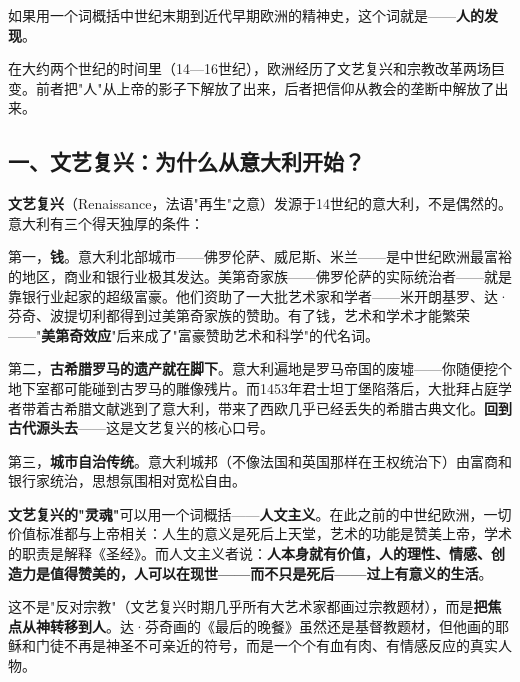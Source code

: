 \documentclass[a4paper,12pt]{ctexart}
\begin{document}
如果用一个词概括中世纪末期到近代早期欧洲的精神史，这个词就是——\textbf{人的发现}。

在大约两个世纪的时间里（14—16世纪），欧洲经历了文艺复兴和宗教改革两场巨变。前者把"人"从上帝的影子下解放了出来，后者把信仰从教会的垄断中解放了出来。

\subsection*{一、文艺复兴：为什么从意大利开始？}

\textbf{文艺复兴}（Renaissance，法语"再生"之意）发源于14世纪的意大利，不是偶然的。意大利有三个得天独厚的条件：

第一，\textbf{钱}。意大利北部城市——佛罗伦萨、威尼斯、米兰——是中世纪欧洲最富裕的地区，商业和银行业极其发达。美第奇家族——佛罗伦萨的实际统治者——就是靠银行业起家的超级富豪。他们资助了一大批艺术家和学者——米开朗基罗、达·芬奇、波提切利都得到过美第奇家族的赞助。有了钱，艺术和学术才能繁荣——"\textbf{美第奇效应}"后来成了"富豪赞助艺术和科学"的代名词。

第二，\textbf{古希腊罗马的遗产就在脚下}。意大利遍地是罗马帝国的废墟——你随便挖个地下室都可能碰到古罗马的雕像残片。而1453年君士坦丁堡陷落后，大批拜占庭学者带着古希腊文献逃到了意大利，带来了西欧几乎已经丢失的希腊古典文化。\textbf{回到古代源头去}——这是文艺复兴的核心口号。

第三，\textbf{城市自治传统}。意大利城邦（不像法国和英国那样在王权统治下）由富商和银行家统治，思想氛围相对宽松自由。

\textbf{文艺复兴的"灵魂"}可以用一个词概括——\textbf{人文主义}。在此之前的中世纪欧洲，一切价值标准都与上帝相关：人生的意义是死后上天堂，艺术的功能是赞美上帝，学术的职责是解释《圣经》。而人文主义者说：\textbf{人本身就有价值，人的理性、情感、创造力是值得赞美的，人可以在现世——而不只是死后——过上有意义的生活}。

这不是"反对宗教"（文艺复兴时期几乎所有大艺术家都画过宗教题材），而是\textbf{把焦点从神转移到人}。达·芬奇画的《最后的晚餐》虽然还是基督教题材，但他画的耶稣和门徒不再是神圣不可亲近的符号，而是一个个有血有肉、有情感反应的真实人物。
\end{document}
